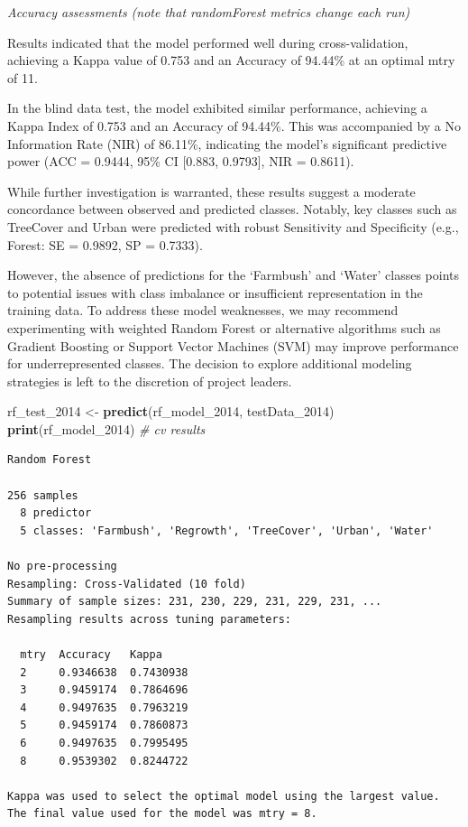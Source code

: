 \documentclass[
]{article}
\newenvironment{Shaded}{\begin{snugshade}}{\end{snugshade}}
\newcommand{\CommentTok}[1]{\textcolor[rgb]{0.56,0.35,0.01}{\textit{#1}}}
\newcommand{\FunctionTok}[1]{\textcolor[rgb]{0.13,0.29,0.53}{\textbf{#1}}}
\newcommand{\NormalTok}[1]{#1}
\newcommand{\OtherTok}[1]{\textcolor[rgb]{0.56,0.35,0.01}{#1}}
\begin{document}
\emph{Accuracy assessments (note that randomForest metrics change each
run)}

Results indicated that the model performed well during cross-validation,
achieving a Kappa value of 0.753 and an Accuracy of 94.44\% at an
optimal mtry of 11.

In the blind data test, the model exhibited similar performance,
achieving a Kappa Index of 0.753 and an Accuracy of 94.44\%. This was
accompanied by a No Information Rate (NIR) of 86.11\%, indicating the
model's significant predictive power (ACC = 0.9444, 95\% CI {[}0.883,
0.9793{]}, NIR = 0.8611).

While further investigation is warranted, these results suggest a
moderate concordance between observed and predicted classes. Notably,
key classes such as TreeCover and Urban were predicted with robust
Sensitivity and Specificity (e.g., Forest: SE = 0.9892, SP = 0.7333).

However, the absence of predictions for the `Farmbush' and `Water'
classes points to potential issues with class imbalance or insufficient
representation in the training data. To address these model weaknesses,
we may recommend experimenting with weighted Random Forest or
alternative algorithms such as Gradient Boosting or Support Vector
Machines (SVM) may improve performance for underrepresented classes. The
decision to explore additional modeling strategies is left to the
discretion of project leaders.

\begin{Shaded}
\begin{Highlighting}[]
\NormalTok{rf\_test\_2014 }\OtherTok{\textless{}{-}} \FunctionTok{predict}\NormalTok{(rf\_model\_2014, testData\_2014)}
\FunctionTok{print}\NormalTok{(rf\_model\_2014) }\CommentTok{\# cv results}
\end{Highlighting}
\end{Shaded}

\begin{verbatim}
Random Forest 

256 samples
  8 predictor
  5 classes: 'Farmbush', 'Regrowth', 'TreeCover', 'Urban', 'Water' 

No pre-processing
Resampling: Cross-Validated (10 fold) 
Summary of sample sizes: 231, 230, 229, 231, 229, 231, ... 
Resampling results across tuning parameters:

  mtry  Accuracy   Kappa    
  2     0.9346638  0.7430938
  3     0.9459174  0.7864696
  4     0.9497635  0.7963219
  5     0.9459174  0.7860873
  6     0.9497635  0.7995495
  8     0.9539302  0.8244722

Kappa was used to select the optimal model using the largest value.
The final value used for the model was mtry = 8.
\end{verbatim}
\end{document}

